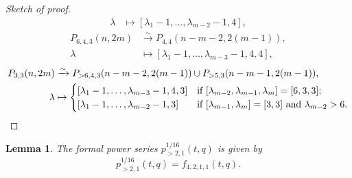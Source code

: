 \documentclass[a4paper, 12pt, reqno]{amsart}
\newtheorem{lemma}[theorem]{Lemma}
\theoremstyle{remark}
\numberwithin{equation}{subsection}
\begin{document}
\begin{proof}[Sketch of proof]
\begin{align*}
    \lambda &\mapsto [\lambda_1 - 1, \dots, \lambda_{m - 2} - 1, 4],
  \end{align*}
  \begin{align*}
    P_{6, 4, 3}(n, 2m) &\xrightarrow{\sim} P_{4, 4}(n - m - 2, 2(m - 1)), \\
    \lambda &\mapsto [\lambda_1 - 1, \dots, \lambda_{m - 3} - 1, 4, 4],
  \end{align*}
  \begin{align*}
    P_{3, 3}(n, 2m) &\xrightarrow{\sim} P_{>6, 4, 3}(n - m - 2, 2(m - 1)) \cup P_{>5, 3}(n - m - 1, 2(m - 1)), \\
    \lambda &\mapsto
              \begin{cases}
                [\lambda_1 - 1, \dots, \lambda_{m - 3} - 1, 4, 3] &\text{if }[\lambda_{m - 2}, \lambda_{m - 1}, \lambda_m] = [6, 3, 3]; \\
                [\lambda_1 - 1, \dots, \lambda_{m - 2} - 1, 3] &\text{if }[\lambda_{m - 1}, \lambda_m] = [3, 3]\text{ and }\lambda_{m - 2} > 6. \qedhere
              \end{cases}
  \end{align*}
\end{proof}

\begin{lemma}
  \label{lmm:32}
  The formal power series $p^{1/16}_{>2, 1}(t, q)$ is given by
  \begin{equation*}
    p^{1/16}_{>2, 1}(t, q) = f_{4, 2, 1, 1}(t, q).
  \end{equation*}
\end{lemma}
\end{document}
